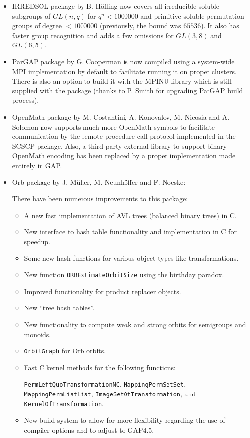 \documentclass[a4paper,11pt]{report}
\begin{document}
{{{\begin{itemize}
\item  \textsf{IRREDSOL} package by B. H{\"o}fling now covers all irreducible soluble subgroups of $GL(n,q)$ for $q^n < 1000000$ and primitive soluble permutation groups of degree $< 1000000$ (previously, the bound was $65536$). It also has faster group recognition and adds a few omissions for $GL(3,8)$ and $GL(6,5)$. 
\item  \textsf{ParGAP} package by G. Cooperman is now compiled using a system-wide MPI implementation
by default to facilitate running it on proper clusters. There is also an
option to build it with the \textsf{MPINU} library which is still supplied with the package (thanks to P. Smith for
upgrading \textsf{ParGAP} build process). 
\item  \textsf{OpenMath} package by M. Costantini, A. Konovalov, M. Nicosia and A. Solomon now supports
much more OpenMath symbols to facilitate communication by the remote procedure
call protocol implemented in the \textsf{SCSCP} package. Also, a third-party external library to support binary OpenMath
encoding has been replaced by a proper implementation made entirely in \textsf{GAP}. 
\item  \textsf{Orb} package by J. M{\"u}ller, M. Neunh{\"o}ffer and F. Noeske: 

 There have been numerous improvements to this package: 
\begin{itemize}
\item  A new fast implementation of AVL trees (balanced binary trees) in C. 
\item  New interface to hash table functionality and implementation in C for speedup. 
\item  Some new hash functions for various object types like transformations. 
\item  New function \texttt{ORB{\textunderscore}EstimateOrbitSize} using the birthday paradox. 
\item  Improved functionality for product replacer objects. 
\item  New ``tree hash tables''. 
\item  New functionality to compute weak and strong orbits for semigroups and
monoids. 
\item  \texttt{OrbitGraph} for Orb orbits. 
\item  Fast C kernel methods for the following functions: 

 \texttt{PermLeftQuoTransformationNC}, \texttt{MappingPermSetSet}, \texttt{MappingPermListList}, \texttt{ImageSetOfTransformation}, and \texttt{KernelOfTransformation}. 
\item  New build system to allow for more flexibility regarding the use of compiler
options and to adjust to \textsf{GAP}{\nobreakspace}4.5. 
\end{itemize}
 

\end{itemize}}}}
\end{document}

